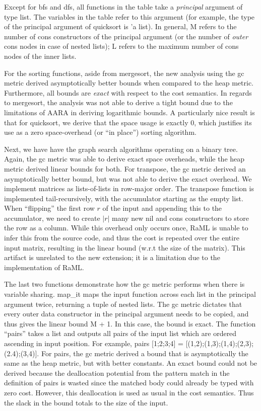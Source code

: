\documentclass{easychair}
\theoremstyle{definition}
\begin{document}
Except for bfs and dfs, all functions in the table take a \emph{principal} argument of type list. 
The variables in the table refer to this argument (for example, the type of the 
principal argument of 
quicksort is 'a list). In general, M refers to the number of cons constructors of the principal 
argument (or the number of \emph{outer} cons nodes in case of nested lists); L refers to the
maximum number of cons nodes of the inner lists.

For the sorting functions, aside from mergesort, the new analysis using the gc metric
derived asymptotically better bounds when compared to the heap metric. Furthermore,
all bounds are \emph{exact} with respect to the cost semantics. In regards to mergesort, 
the analysis was not able to derive a tight bound due to the limitations of AARA in deriving 
logarithmic bounds. A particularly nice result is that for quicksort, we derive that
the space usage is exactly 0, which justifies its use as a zero space-overhead 
(or ``in  place'') sorting algorithm.

Next, we have have the graph search algorithms operating on a binary tree. Again, the gc metric
was able to derive exact space overheads, while the heap metric derived linear bounds for both.
%
For transpose, the gc metric derived an asymptotically better bound, but was not able to derive 
the exact overhead. We implement matrices as lists-of-lists in row-major order. 
The transpose function is implemented tail-recursively, with the accumulator starting as the 
empty list. When ``flipping'' the first row $r$ of the input and appending this to the accumulator, 
we need to create $|r|$ many new nil and cons constructors to store the row as a column. While this
overhead only occurs once, RaML is unable to infer this from the source code, and thus the cost
is repeated over the entire input matrix, resulting in the linear bound (w.r.t the size of the 
matrix). This artifact is unrelated to the new extension; it is a limitation
due to the implementation of RaML. 

The last two functions demonstrate how the gc metric performs when there is variable sharing.
map\_it maps the input function across each list in the principal argument twice, returning a
tuple of nested lists. The gc metric dictates that every outer data constructor in the 
principal argument needs to be copied, and thus gives the linear bound M + 1. In this case,
the bound is exact. The function ``pairs'' takes a list and outputs all pairs of the input list 
which are ordered ascending in input position. For example, 
pairs [1;2;3;4] = [(1,2);(1,3);(1,4);(2,3);(2.4);(3,4)]. For pairs, the gc metric derived a bound
that is asymptotically the same as the heap metric, but with better constants. An exact bound 
could not be derived because the deallocation potential from the pattern match in the 
definition of pairs is wasted since the matched body could already be typed with zero cost. 
However, this deallocation is used as usual in the cost semantics. Thus the slack in the bound 
totals to the size of the input. %
\end{document}

